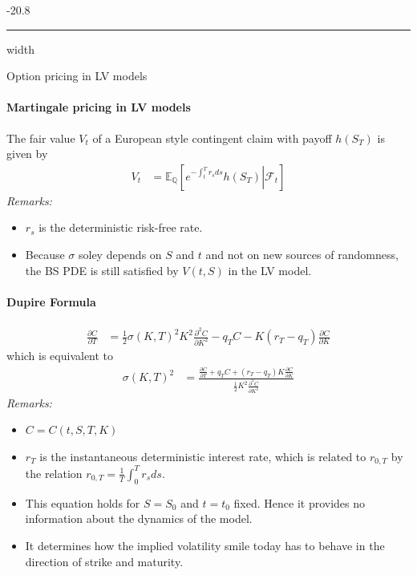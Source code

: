 \documentclass[a4paper,landscape,7pt,fleqn]{scrartcl}
\makeatletter
\renewcommand{\subsubsection}{\@startsection{subsubsection}{1}{0mm}%
{-2\baselineskip}{0.8\baselineskip}%
{\hrule depth 0.2pt width\columnwidth\vspace*{1.2em}\normalsize\bfseries}}
\makeatother
\begin{document}
\begin{multicols*}{3}
\subsubsection{Option pricing in LV models}

\paragraph{Martingale pricing in LV models}
The fair value $V_t$ of a European style contingent claim with payoff $h(S_T)$ is given by
\begin{align*}
V_t &= \mathbb{E}_\mathbb{Q} \left[ \left. e^{-\int_t^T r_s ds} h(S_T) \right| \mathcal{F}_t \right]
\end{align*}
\textit{Remarks:}
\begin{itemize}
\item $r_s$ is the deterministic risk-free rate.
\item Because $\sigma$ soley depends on $S$ and $t$ and not on new sources of randomness, the BS PDE is still satisfied by $V(t,S)$ in the LV model.
\end{itemize}

\paragraph{Dupire Formula}
\begin{align*}
\frac{\partial C}{\partial T} &= \frac{1}{2} \sigma (K,T)^2 K^2 \frac{\partial^2 C}{\partial K^2} - q_T C - K(r_T - q_T) \frac{\partial C}{\partial K}
\end{align*}
which is equivalent to
\begin{align*}
\sigma (K,T)^2 &= \frac{\frac{\partial C}{\partial T} + q_T C + (r_T - q_T) K \frac{\partial C}{\partial K}}{\frac{1}{2} K^2 \frac{\partial^2 C}{\partial K^2}}
\end{align*}
\textit{Remarks:}
\begin{itemize}
\item $C = C(t,S,T,K)$
\item $r_T$ is the instantaneous deterministic interest rate, which is related to $r_{0,T}$ by the relation $r_{0,T} = \frac{1}{T} \int_0^T r_s ds$.
\item This equation holds for $S = S_0$ and $t = t_0$ fixed. Hence it provides no information about the dynamics of the model.
\item It determines how the implied volatility smile today has to behave in the direction of strike and maturity.
\end{itemize}


\end{multicols*}
\end{document}
